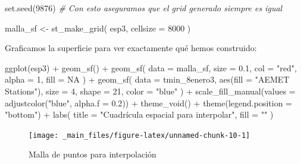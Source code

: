 \documentclass[
]{report}
\newenvironment{Shaded}{\begin{snugshade}}{\end{snugshade}}
\newcommand{\AttributeTok}[1]{\textcolor[rgb]{0.77,0.63,0.00}{#1}}
\newcommand{\CommentTok}[1]{\textcolor[rgb]{0.56,0.35,0.01}{\textit{#1}}}
\newcommand{\ConstantTok}[1]{\textcolor[rgb]{0.00,0.00,0.00}{#1}}
\newcommand{\DecValTok}[1]{\textcolor[rgb]{0.00,0.00,0.81}{#1}}
\newcommand{\FloatTok}[1]{\textcolor[rgb]{0.00,0.00,0.81}{#1}}
\newcommand{\FunctionTok}[1]{\textcolor[rgb]{0.00,0.00,0.00}{#1}}
\newcommand{\NormalTok}[1]{#1}
\newcommand{\OtherTok}[1]{\textcolor[rgb]{0.56,0.35,0.01}{#1}}
\newcommand{\SpecialCharTok}[1]{\textcolor[rgb]{0.00,0.00,0.00}{#1}}
\newcommand{\StringTok}[1]{\textcolor[rgb]{0.31,0.60,0.02}{#1}}
\theoremstyle{definition}
\theoremstyle{definition}
\theoremstyle{definition}
\theoremstyle{definition}
\theoremstyle{remark}
\begin{document}
\begin{Shaded}
\begin{Highlighting}[]
\FunctionTok{set.seed}\NormalTok{(}\DecValTok{9876}\NormalTok{) }\CommentTok{\# Con esto aseguramos que el grid generado siempre es igual}

\NormalTok{malla\_sf }\OtherTok{\textless{}{-}} \FunctionTok{st\_make\_grid}\NormalTok{(}
\NormalTok{  esp3,}
  \AttributeTok{cellsize =} \DecValTok{8000}
\NormalTok{)}
\end{Highlighting}
\end{Shaded}

Graficamos la superficie para ver exactamente qué hemos construido:

\begin{Shaded}
\begin{Highlighting}[]

\FunctionTok{ggplot}\NormalTok{(esp3) }\SpecialCharTok{+}
  \FunctionTok{geom\_sf}\NormalTok{() }\SpecialCharTok{+}
  \FunctionTok{geom\_sf}\NormalTok{(}
    \AttributeTok{data =}\NormalTok{ malla\_sf,}
    \AttributeTok{size =} \FloatTok{0.1}\NormalTok{,}
    \AttributeTok{col =} \StringTok{"red"}\NormalTok{, }\AttributeTok{alpha =} \DecValTok{1}\NormalTok{,}
    \AttributeTok{fill =} \ConstantTok{NA}
\NormalTok{  ) }\SpecialCharTok{+}
  \FunctionTok{geom\_sf}\NormalTok{(}
    \AttributeTok{data =}\NormalTok{ tmin\_8enero3,}
    \FunctionTok{aes}\NormalTok{(}\AttributeTok{fill =} \StringTok{"AEMET Stations"}\NormalTok{), }\AttributeTok{size =} \DecValTok{4}\NormalTok{, }\AttributeTok{shape =} \DecValTok{21}\NormalTok{,}
    \AttributeTok{color =} \StringTok{"blue"}
\NormalTok{  ) }\SpecialCharTok{+}
  \FunctionTok{scale\_fill\_manual}\NormalTok{(}\AttributeTok{values =} \FunctionTok{adjustcolor}\NormalTok{(}\StringTok{"blue"}\NormalTok{, }\AttributeTok{alpha.f =} \FloatTok{0.2}\NormalTok{)) }\SpecialCharTok{+}
  \FunctionTok{theme\_void}\NormalTok{() }\SpecialCharTok{+}
  \FunctionTok{theme}\NormalTok{(}\AttributeTok{legend.position =} \StringTok{"bottom"}\NormalTok{) }\SpecialCharTok{+}
  \FunctionTok{labs}\NormalTok{(}
    \AttributeTok{title =} \StringTok{"Cuadrícula espacial para interpolar"}\NormalTok{,}
    \AttributeTok{fill =} \StringTok{""}
\NormalTok{  )}
\end{Highlighting}
\end{Shaded}

\begin{figure}

{\centering \texttt{[image: \_main\_files/figure-latex/unnamed-chunk-10-1]} 

}

\caption{Malla de puntos para interpolación}\label{fig:unnamed-chunk-10}
\end{figure}
\end{document}
